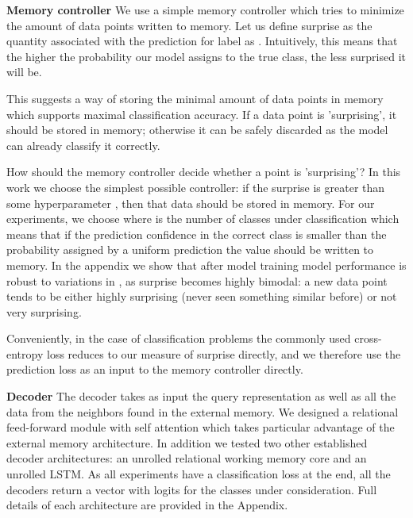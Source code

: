 \documentclass{article} \usepackage{iclr2019_conference,times}
\begin{document}
\textbf{Memory controller} We use a simple memory controller which tries to minimize the amount of data points written to memory. Let us define surprise as the quantity associated with the prediction for label  as . Intuitively, this means that the higher the probability our model assigns to the true class, the less surprised it will be.

This suggests a way of storing the minimal amount of data points in memory which supports maximal classification accuracy. If a data point is 'surprising', it should be stored in memory; otherwise it can be safely discarded as the model can already classify it correctly.

How should the memory controller decide whether a point is 'surprising'? In this work we choose the simplest possible controller: if the surprise is greater than some hyperparameter , then that data should be stored in memory. For our experiments, we choose  where  is the number of classes under classification which means that if the prediction confidence in the correct class is smaller than the probability assigned by a uniform prediction the value should be written to memory. In the appendix we show that after model training model performance is robust to variations in , as surprise becomes highly bimodal: a new data point tends to be either highly surprising (never seen something similar before) or not very surprising.

Conveniently, in the case of classification problems the commonly used cross-entropy loss reduces to our measure of surprise directly, and we therefore use the prediction loss as an input to the memory controller directly.

\textbf{Decoder} The decoder takes as input the query representation as well as all the data from the neighbors found in the external memory. We designed a relational feed-forward module with self attention which takes particular advantage of the external memory architecture. In addition we tested two other established decoder architectures: an unrolled relational working memory core and an unrolled LSTM. As all experiments have a classification loss at the end, all the decoders return a vector with logits for the  classes under consideration. Full details of each architecture are provided in the Appendix.
\end{document}
